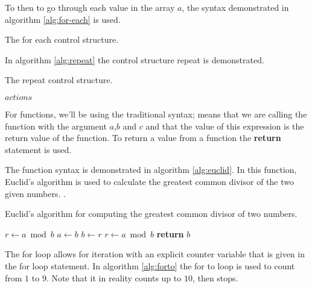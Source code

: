 To then to go through each value in the array $a$, the syntax
demonstrated in algorithm \ref{alg:for-each} is used.

\begin{algorithm}[H]
  \caption{The for each control structure.}
  \label{alg:for-each}
  \begin{algorithmic}[1]
    \EndForEach
  \end{algorithmic}
\end{algorithm}

In algorithm \ref{alg:repeat} the control structure repeat is
demonstrated.

\begin{algorithm}[H]
  \caption{The repeat control structure.}
  \label{alg:repeat}
  \begin{algorithmic}[1]
    \State $actions$ 
    \EndRepeatn
  \end{algorithmic}
\end{algorithm}

For functions, we'll be using the traditional syntax;
 means that we are calling the function
 with the argument $a$,$b$ and $c$ and that the value
of this expression is the return value of the function. To return a
value from a function the \textbf{return} statement is used.

The function syntax is demonstrated in algorithm \ref{alg:euclid}. In
this function, Euclid's algorithm is used to calculate the greatest
common divisor of the two given numbers.
\cite{cormen2009introduction_to_algo,weisstein:_euclid_algor}.

\begin{algorithm}
  \caption{Euclid's algorithm for computing the greatest common
    divisor of two numbers.}
  \label{alg:euclid}
  \begin{algorithmic}[1]
    \State $r\gets a\bmod b$
    \State $a\gets b$
    \State $b\gets r$
    \State $r\gets a\bmod b$
    \EndWhile
    \State \textbf{return} $b$
    \EndProcedure
  \end{algorithmic}
\end{algorithm}

The for loop allows for iteration with an explicit counter variable
that is given in the for loop statement. In algorithm \ref{alg:forto}
the for to loop is used to count from $1$ to $9$. Note that it in
reality counts up to $10$, then stops.

